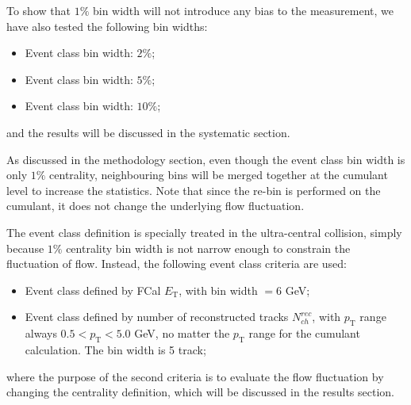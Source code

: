 To show that $1\%$ bin width will not introduce any bias to the measurement, we have also tested the following bin widths:
\begin{itemize}
\item Event class bin width: $2\%$;
\item Event class bin width: $5\%$;
\item Event class bin width: $10\%$;
\end{itemize}
and the results will be discussed in the systematic section.

As discussed in the methodology section, even though the event class bin width is only $1\%$ centrality, neighbouring bins will be merged together at the cumulant level to increase the statistics. Note that since the re-bin is performed on the cumulant, it does not change the underlying flow fluctuation.

The event class definition is specially treated in the ultra-central collision, simply because $1\%$ centrality bin width is not narrow enough to constrain the fluctuation of flow. Instead, the following event class criteria are used:
\begin{itemize}
\item Event class defined by FCal $E_\text{T}$, with bin width $=6$ GeV;
\item Event class defined by number of reconstructed tracks $N_{ch}^{rec}$, with $p_\text{T}$ range always $0.5<p_\text{T}<5.0$ GeV, no matter the $p_\text{T}$ range for the cumulant calculation. The bin width is 5 track;
\end{itemize}
where the purpose of the second criteria is to evaluate the flow fluctuation by changing the centrality definition, which will be discussed in the results section.

